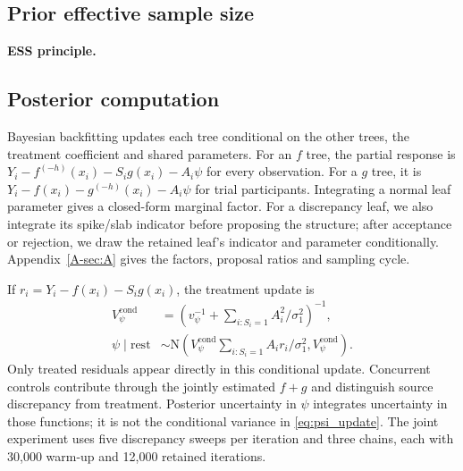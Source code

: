 \documentclass[11pt]{article}
\newcommand{\N}{\mathrm{N}}
\theoremstyle{remark}\newtheorem{remark}{Remark}[section]
\providecommand{\DIFaddtex}[1]{{\protect\color{blue} \sf #1}} %
\providecommand{\DIFdeltex}[1]{{\protect\color{red} \scriptsize #1}} %
\providecommand{\DIFaddbegin}{} %
\providecommand{\DIFdelbegin}{} %
\providecommand{\DIFdelend}{} %
\providecommand{\DIFadd}[1]{\texorpdfstring{\DIFaddtex{#1}}{#1}} %
\providecommand{\DIFdel}[1]{\texorpdfstring{\DIFdeltex{#1}}{}} %
\begin{document}
\DIFdelbegin \subsection{\DIFdel{Prior effective sample size}}
\addtocounter{subsection}{-1}%
\DIFdel{\textbf{ESS principle.}
}\DIFdelend \DIFaddbegin \subsection{\DIFadd{Posterior computation}}\label{sec:computation}
\DIFadd{Bayesian backfitting updates each tree conditional on the other trees, the treatment coefficient and shared parameters. For an $f$ tree, the partial response is $Y_i-f^{(-h)}(x_i)-S_i g(x_i)-A_i\psi$ for every observation. For a $g$ tree, it is $Y_i-f(x_i)-g^{(-h)}(x_i)-A_i\psi$ for trial participants. Integrating a normal leaf parameter gives a closed-form marginal factor. For a discrepancy leaf, we also integrate its spike/slab indicator before proposing the structure; after acceptance or rejection, we draw the retained leaf's indicator and parameter conditionally. Appendix~\ref{A-sec:A} gives the factors, proposal ratios and sampling cycle.
}

\DIFadd{If $r_i=Y_i-f(x_i)-S_i g(x_i)$, the treatment update is
}\begin{equation}\label{eq:psi_update}
\begin{aligned}
V_\psi^{\mathrm{cond}}&=\left(v_\psi^{-1}+\sum_{i:S_i=1}A_i^2/\sigma_1^2\right)^{-1},\\
\psi\mid\mathrm{rest}&\sim\N\!\left(
V_\psi^{\mathrm{cond}}\sum_{i:S_i=1}A_i r_i/\sigma_1^2,
V_\psi^{\mathrm{cond}}\right).
\end{aligned}
\end{equation}
\DIFadd{Only treated residuals appear directly in this conditional update. Concurrent controls contribute through the jointly estimated $f+g$ and distinguish source discrepancy from treatment. Posterior uncertainty in $\psi$ integrates uncertainty in those functions; it is not the conditional variance in \eqref{eq:psi_update}. The joint experiment uses five discrepancy sweeps per iteration and three chains, each with 30,000 warm-up and 12,000 retained iterations.
}
\end{document}
